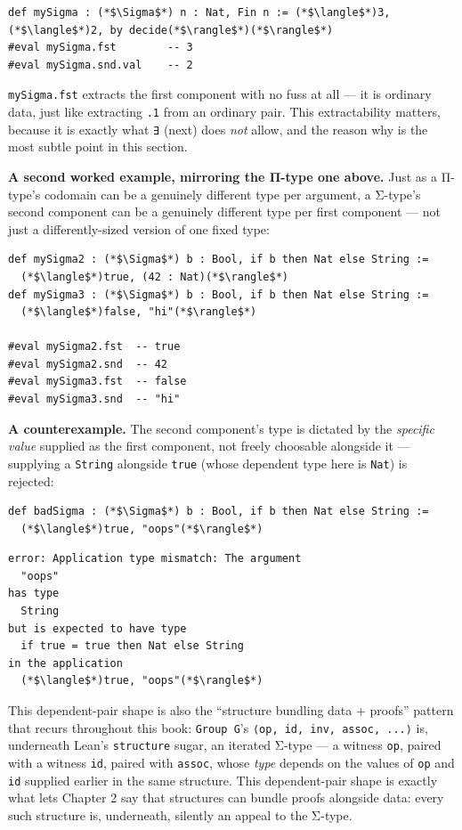 \begin{lstlisting}
def mySigma : (*$\Sigma$*) n : Nat, Fin n := (*$\langle$*)3, (*$\langle$*)2, by decide(*$\rangle$*)(*$\rangle$*)
#eval mySigma.fst        -- 3
#eval mySigma.snd.val    -- 2
\end{lstlisting}

\texttt{mySigma.fst} extracts the first component with no fuss at all --- it is ordinary data, just like extracting \texttt{.1} from an ordinary pair. This extractability matters, because it is exactly what \texttt{∃} (next) does \emph{not} allow, and the reason why is the most subtle point in this section.

\textbf{A second worked example, mirroring the Π-type one above.} Just as a Π-type's codomain can be a genuinely different type per argument, a Σ-type's second component can be a genuinely different type per first component --- not just a differently-sized version of one fixed type:

\begin{lstlisting}
def mySigma2 : (*$\Sigma$*) b : Bool, if b then Nat else String :=
  (*$\langle$*)true, (42 : Nat)(*$\rangle$*)
def mySigma3 : (*$\Sigma$*) b : Bool, if b then Nat else String :=
  (*$\langle$*)false, "hi"(*$\rangle$*)

#eval mySigma2.fst  -- true
#eval mySigma2.snd  -- 42
#eval mySigma3.fst  -- false
#eval mySigma3.snd  -- "hi"
\end{lstlisting}

\textbf{A counterexample.} The second component's type is dictated by the \emph{specific value} supplied as the first component, not freely choosable alongside it --- supplying a \texttt{String} alongside \texttt{true} (whose dependent type here is \texttt{Nat}) is rejected:

\begin{lstlisting}
def badSigma : (*$\Sigma$*) b : Bool, if b then Nat else String :=
  (*$\langle$*)true, "oops"(*$\rangle$*)
\end{lstlisting}

\begin{lstlisting}
error: Application type mismatch: The argument
  "oops"
has type
  String
but is expected to have type
  if true = true then Nat else String
in the application
  (*$\langle$*)true, "oops"(*$\rangle$*)
\end{lstlisting}

This dependent-pair shape is also the ``structure bundling data + proofs'' pattern that recurs throughout this book: \texttt{Group G}'s \texttt{⟨op, id, inv, assoc, ...⟩} is, underneath Lean's \texttt{structure} sugar, an iterated Σ-type --- a witness \texttt{op}, paired with a witness \texttt{id}, paired with \texttt{assoc}, whose \emph{type} depends on the values of \texttt{op} and \texttt{id} supplied earlier in the same structure. This dependent-pair shape is exactly what lets Chapter 2 say that structures can bundle proofs alongside data: every such structure is, underneath, silently an appeal to the Σ-type.

